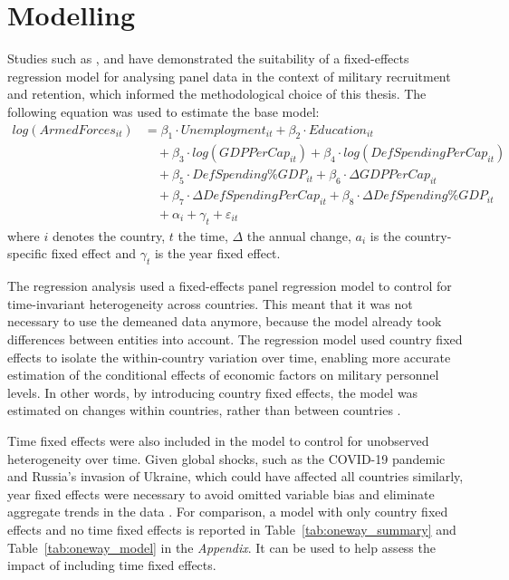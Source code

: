 \section{Modelling}

Studies such as \textcite{asch_cash_2010}, \textcite{backstrom_are_2019} and \textcite{balcaen_unemployment_2025} have demonstrated the suitability of a fixed-effects regression model for analysing panel data in the context of military recruitment and retention, which informed the methodological choice of this thesis.
The following equation was used to estimate the base model:
\begin{align*}
log(ArmedForces_{it}) &= \beta_1 \cdot Unemployment_{it} 
+ \beta_2 \cdot Education_{it} \\
&\quad + \beta_3 \cdot log(GDPPerCap_{it}) 
+ \beta_4 \cdot log(DefSpendingPerCap_{it}) \\
&\quad + \beta_5 \cdot DefSpending\%GDP_{it} 
+ \beta_6 \cdot \Delta GDPPerCap_{it} \\
&\quad + \beta_7 \cdot \Delta DefSpendingPerCap_{it} 
+ \beta_8 \cdot \Delta DefSpending\%GDP_{it} \\
&\quad + \alpha_i + \gamma_t + \varepsilon_{it}
\end{align*}
where $i$ denotes the country, $t$ the time, $\Delta$ the annual change, $a_i$ is the country-specific fixed effect and $\gamma_t$ is the year fixed effect.

The regression analysis used a fixed-effects panel regression model to control for time-invariant heterogeneity across countries. 
This meant that it was not necessary to use the demeaned data anymore, because the model already took differences between entities into account.
The regression model used country fixed effects to isolate the within-country variation over time, enabling more accurate estimation of the conditional effects of economic factors on military personnel levels.
In other words, by introducing country fixed effects, the model was estimated on changes within countries, rather than between countries \parencite{backstrom_are_2019}.

Time fixed effects were also included in the model to control for unobserved heterogeneity over time. 
Given global shocks, such as the COVID-19 pandemic and Russia's invasion of Ukraine, which could have affected all countries similarly, year fixed effects were necessary to avoid omitted variable bias and eliminate aggregate trends in the data \parencite{backstrom_are_2019}.
For comparison, a model with only country fixed effects and no time fixed effects is reported in Table~\ref{tab:oneway_summary} and Table~\ref{tab:oneway_model} in the \textit{Appendix}.
It can be used to help assess the impact of including time fixed effects.


